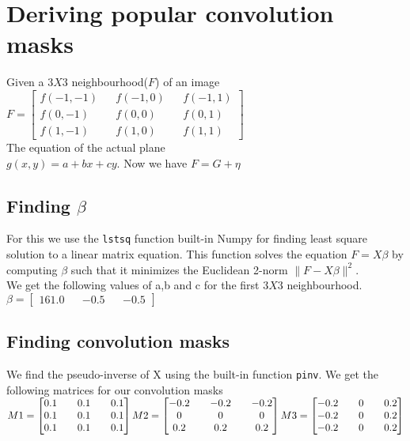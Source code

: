 \documentclass[paper=a4, fontsize=11pt]{scrartcl} %
\numberwithin{equation}{section} %
\numberwithin{figure}{section} %
\numberwithin{table}{section} %
\begin{document}
\section{Deriving popular convolution masks}
Given a \(3X3\) neighbourhood(\(F\)) of an image 
    \\\(F = \begin{bmatrix}
            f(-1,-1) && f(-1,0) && f(-1,1) \\
            f(0,-1) && f(0,0) && f(0,1) \\ 
            f(1,-1) && f(1,0) && f(1,1) 
            \end{bmatrix}\)
    \\
    The equation of the actual plane
    \\ \(g(x,y) = a + bx + cy. \)
    Now we have \(F = G + \eta \)
    \subsection{Finding \(\beta\)}
    For this we use the \texttt{lstsq} function built-in Numpy for finding least square solution to a linear matrix equation.
    This function solves the equation \(F=X\beta\) by computing \(\beta\) such that it minimizes the Euclidean 2-norm \(\|F-X\beta\|^2\). \\
    We get the following values of a,b and c for the first \(3X3\) neighbourhood.
    \\\( \beta = 
        \begin{bmatrix}
            161.0 && -0.5 && -0.5
        \end{bmatrix}
    \)

    \subsection{Finding convolution masks}
    We find the pseudo-inverse of X using the built-in function \texttt{pinv}. We get the following matrices for our convolution masks
    \\\(M1 = \begin{bmatrix}
            0.1 && 0.1 && 0.1 \\ 0.1 && 0.1 && 0.1 \\ 0.1 && 0.1 && 0.1

        \end{bmatrix}
      \\
      M2 = \begin{bmatrix}
           -0.2 && -0.2 && -0.2 \\ 0 && 0 && 0 \\ 0.2 && 0.2 && 0.2
          \end{bmatrix}
      \\
      M3 = \begin{bmatrix}
          -0.2 && 0 && 0.2 \\ -0.2 && 0 && 0.2 \\ -0.2 && 0 && 0.2
            \end{bmatrix}
     \)
\end{document}
